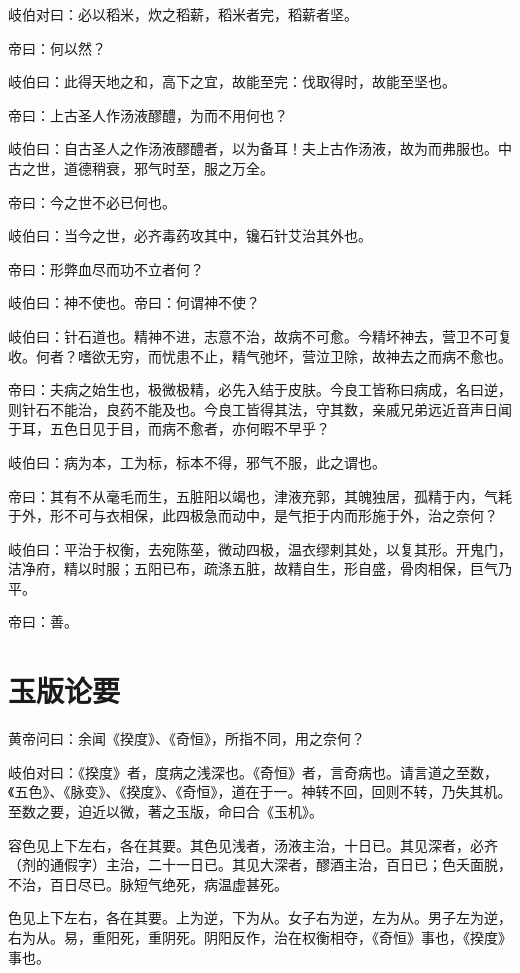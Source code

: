 \documentclass{article}%
\begin{document}
岐伯对曰：必以稻米，炊之稻薪，稻米者完，稻薪者坚。

帝曰：何以然？

岐伯曰：此得天地之和，高下之宜，故能至完：伐取得时，故能至坚也。

帝曰：上古圣人作汤液醪醴，为而不用何也？

岐伯曰：自古圣人之作汤液醪醴者，以为备耳！夫上古作汤液，故为而弗服也。中古之世，道德稍衰，邪气时至，服之万全。

帝曰：今之世不必已何也。

岐伯曰：当今之世，必齐毒药攻其中，镵石针艾治其外也。

帝曰：形弊血尽而功不立者何？

岐伯曰：神不使也。帝曰：何谓神不使？

岐伯曰：针石道也。精神不进，志意不治，故病不可愈。今精坏神去，营卫不可复收。何者？嗜欲无穷，而忧患不止，精气弛坏，营泣卫除，故神去之而病不愈也。

帝曰：夫病之始生也，极微极精，必先入结于皮肤。今良工皆称曰病成，名曰逆，则针石不能治，良药不能及也。今良工皆得其法，守其数，亲戚兄弟远近音声日闻于耳，五色日见于目，而病不愈者，亦何暇不早乎？

岐伯曰：病为本，工为标，标本不得，邪气不服，此之谓也。

帝曰：其有不从毫毛而生，五脏阳以竭也，津液充郭，其魄独居，孤精于内，气耗于外，形不可与衣相保，此四极急而动中，是气拒于内而形施于外，治之奈何？

岐伯曰：平治于权衡，去宛陈莝，微动四极，温衣缪剌其处，以复其形。开鬼门，洁净府，精以时服；五阳已布，疏涤五脏，故精自生，形自盛，骨肉相保，巨气乃平。

帝曰：善。
\section{玉版论要}
黄帝问曰：余闻《揆度》、《奇恒》，所指不同，用之奈何？

岐伯对曰：《揆度》者，度病之浅深也。《奇恒》者，言奇病也。请言道之至数，《五色》、《脉变》、《揆度》、《奇恒》，道在于一。神转不回，回则不转，乃失其机。至数之要，迫近以微，著之玉版，命曰合《玉机》。

容色见上下左右，各在其要。其色见浅者，汤液主治，十日已。其见深者，必齐（剂的通假字）主治，二十一日已。其见大深者，醪酒主治，百日已；色夭面脱，不治，百日尽已。脉短气绝死，病温虚甚死。

色见上下左右，各在其要。上为逆，下为从。女子右为逆，左为从。男子左为逆，右为从。易，重阳死，重阴死。阴阳反作，治在权衡相夺，《奇恒》事也，《揆度》事也。
\end{document}

